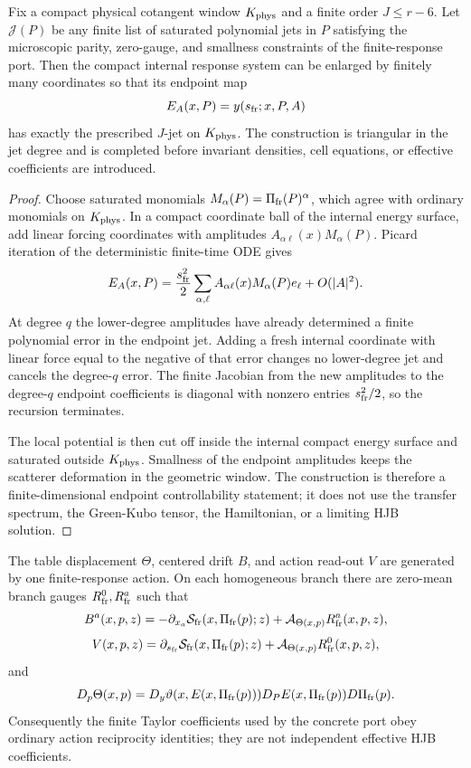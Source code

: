 \begin{lemma}
\label{lem:supp_exact_endpoint_jets}
Fix a compact physical cotangent window \(K_{\rm phys}\) and a finite order
\(J\le r-6\).  Let \(\mathcal J(P)\) be any finite list of saturated polynomial
jets in \(P\) satisfying the microscopic parity, zero-gauge, and smallness
constraints of the finite-response port.  Then the compact internal response
system can be enlarged by finitely many coordinates so that its endpoint map
\[
  E_A(x,P)=y(s_{\rm fr};x,P,A)
\]
has exactly the prescribed \(J\)-jet on \(K_{\rm phys}\).  The construction is
triangular in the jet degree and is completed before invariant densities,
cell equations, or effective coefficients are introduced.
\end{lemma}

\begin{proof}
Choose saturated monomials \(M_\alpha(P)=\Pi_{\rm fr}(P)^\alpha\), which agree
with ordinary monomials on \(K_{\rm phys}\).  In a compact coordinate ball of
the internal energy surface, add linear forcing coordinates with amplitudes
\(A_{\alpha\ell}(x)M_\alpha(P)\).  Picard iteration of the deterministic
finite-time ODE gives
\[
  E_A(x,P)=\frac{s_{\rm fr}^2}{2}
  \sum_{\alpha,\ell}A_{\alpha\ell}(x)M_\alpha(P)e_\ell+O(|A|^2).
\]
At degree \(q\) the lower-degree amplitudes have already determined a finite
polynomial error in the endpoint jet.  Adding a fresh internal coordinate with
linear force equal to the negative of that error changes no lower-degree jet
and cancels the degree-\(q\) error.  The finite Jacobian from the new
amplitudes to the degree-\(q\) endpoint coefficients is diagonal with
nonzero entries \(s_{\rm fr}^2/2\), so the recursion terminates.

The local potential is then cut off inside the internal compact energy surface
and saturated outside \(K_{\rm phys}\).  Smallness of the endpoint amplitudes
keeps the scatterer deformation in the geometric window.  The construction is
therefore a finite-dimensional endpoint controllability statement; it does not
use the transfer spectrum, the Green-Kubo tensor, the Hamiltonian, or a
limiting HJB solution.
\end{proof}

\begin{proposition}
\label{prop:supp_endpoint_reciprocity}
The table displacement \(\Theta\), centered drift \(B\), and action read-out
\(V\) are generated by one finite-response action.  On each homogeneous branch
there are zero-mean branch gauges \(R_{\rm fr}^0,R_{\rm fr}^a\) such that
\[
  B^a(x,p,z)
  =
  -\partial_{x_a}\mathcal S_{\rm fr}(x,\Pi_{\rm fr}(p);z)
  +\mathcal A_{\Theta(x,p)}R_{\rm fr}^a(x,p,z),
\]
\[
  V(x,p,z)
  =
  \partial_{s_{\rm fr}}\mathcal S_{\rm fr}(x,\Pi_{\rm fr}(p);z)
  +\mathcal A_{\Theta(x,p)}R_{\rm fr}^0(x,p,z),
\]
and
\[
  D_p\Theta(x,p)
  =
  D_y\vartheta(x,E(x,\Pi_{\rm fr}(p)))
  D_PE(x,\Pi_{\rm fr}(p))D\Pi_{\rm fr}(p).
\]
Consequently the finite Taylor coefficients used by the concrete port obey
ordinary action reciprocity identities; they are not independent effective HJB
coefficients.
\end{proposition}

